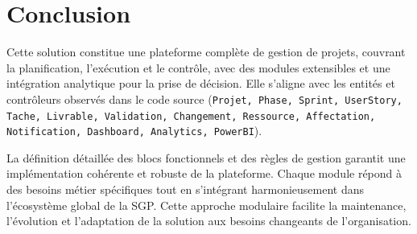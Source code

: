 \section{Conclusion}

Cette solution constitue une plateforme complète de gestion de projets, couvrant la planification, l'exécution et le contrôle, avec des modules extensibles et une intégration analytique pour la prise de décision. Elle s'aligne avec les entités et contrôleurs observés dans le code source (\texttt{Projet, Phase, Sprint, UserStory, Tache, Livrable, Validation, Changement, Ressource, Affectation, Notification, Dashboard, Analytics, PowerBI}). 

La définition détaillée des blocs fonctionnels et des règles de gestion garantit une implémentation cohérente et robuste de la plateforme. Chaque module répond à des besoins métier spécifiques tout en s'intégrant harmonieusement dans l'écosystème global de la SGP. Cette approche modulaire facilite la maintenance, l'évolution et l'adaptation de la solution aux besoins changeants de l'organisation. 